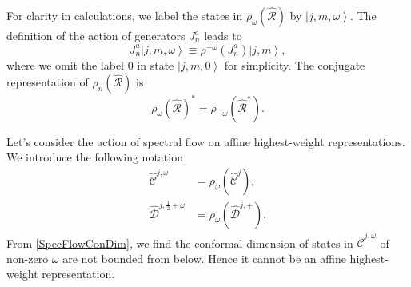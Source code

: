 \documentclass[10pt,a4paper]{article}
\numberwithin{equation}{section}
\newcommand{\ket}[1]{\left| #1 \right\rangle}
\begin{document}
For clarity in calculations, we label the states in $\rho_{\omega}\left(\widehat{\mathcal{R}}\right)$ by $\ket{j,m,\omega}$. The definition 
of the action of generators $J^{a}_{n}$ leads to
\begin{equation}
    J^{a}_{n} \ket{j,m,\omega} \equiv \rho^{-\omega} \left(J^{a}_{n}\right) \ket{j,m},
\end{equation}
where we omit the label $0$ in state $\ket{j,m,0}$ for simplicity. 
The conjugate representation of $\rho_{n} \left(\widehat{\mathcal{R}} \right)$ is 
\begin{equation}
    \rho_{\omega} \left( \widehat{\mathcal{R}} \right)^{*} = \rho_{-\omega} \left(\widehat{\mathcal{R}}^{*} \right).
\end{equation}

Let's consider the action of spectral flow on affine highest-weight representations. We introduce the following notation 
\begin{equation}
    \begin{aligned}
        \hat{\mathcal{C}}^{j,\omega} &= \rho_{\omega} \left( \hat{\mathcal{C}}^{j} \right),\\
        \hat{\mathcal{D}}^{j, \frac{1}{2} + \omega} &= \rho_{\omega} \left( \hat{\mathcal{D}}^{j, +} \right).
    \end{aligned} \label{SpecFlowNotation}
\end{equation}
From \eqref{SpecFlowConDim}, we find the conformal dimension of states in $\hat{\mathcal{C}}^{j,\omega}$ of non-zero $\omega$ are not bounded 
from below. Hence it cannot be an affine highest-weight representation.
\end{document}

